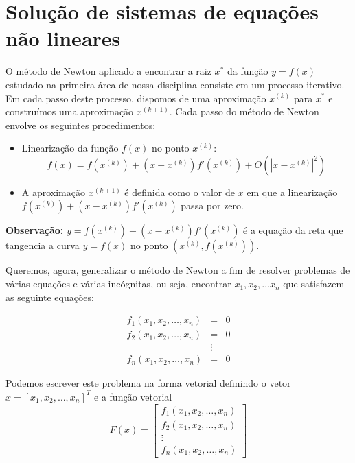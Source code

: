 
%

\chapter{Solução de sistemas de equações não lineares}

O método de Newton aplicado a encontrar a raiz $x^*$ da função $y=f(x)$ estudado na primeira área de nossa disciplina consiste em um processo iterativo. Em cada passo deste processo, dispomos de uma aproximação $x^{(k)}$ para $x^*$ e construímos uma aproximação $x^{(k+1)}$.  Cada passo do método de Newton envolve os seguintes procedimentos:
\begin{itemize}
\item Linearização da função $f(x)$ no ponto $x^{(k)}$: 
  \begin{equation*}
f(x)= f(x^{(k)})+ (x-x^{(k)}) f'(x^{(k)}) + O\left(|x-x^{(k)}|^2\right)    
  \end{equation*}
\item A aproximação $x^{(k+1)}$ é definida como o valor de $x$ em que a linearização $f(x^{(k)})+ (x-x^{(k)}) f'(x^{(k)})$ passa por zero.
\end{itemize}

{\bf Observação:} $y=f(x^{(k)})+ (x-x^{(k)}) f'(x^{(k)})$ é a equação da reta que tangencia a curva $y=f(x)$ no ponto $(x^{(k)},f(x^{(k)}))$.


Queremos, agora, generalizar o método de Newton a fim de resolver problemas de várias equações e várias incógnitas, ou seja, encontrar $x_1,x_2,\ldots x_n$ que satisfazem as seguinte equações:

\begin{eqnarray*}
f_1(x_1,x_2,\ldots,x_n)&=&0\\
f_2(x_1,x_2,\ldots,x_n)&=&0\\
&\vdots&\\
f_n(x_1,x_2,\ldots,x_n)&=&0
\end{eqnarray*}

Podemos escrever este problema na forma vetorial definindo o vetor $x=[x_1,x_2,\ldots,x_n]^T$ e a função vetorial
$$F(x)=\left[
\begin{array}{c}
f_1(x_1,x_2,\ldots,x_n)\\
f_2(x_1,x_2,\ldots,x_n)\\
\vdots\\
f_n(x_1,x_2,\ldots,x_n)
\end{array}
\right]$$

